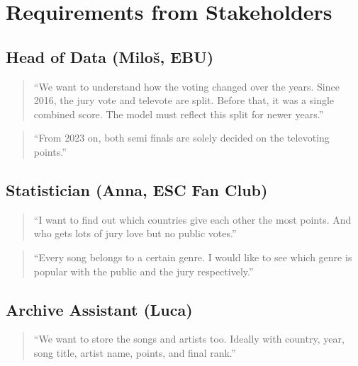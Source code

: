 \section{Requirements from Stakeholders}

\subsection*{Head of Data (Miloš, EBU)}
\begin{quote}
“We want to understand how the voting changed over the years. Since 2016, the jury vote and televote are split. Before that, it was a single combined score. The model must reflect this split for newer years.”
\end{quote}

\begin{quote}
“From 2023 on, both semi finals are solely decided on the televoting points.”
\end{quote}

\subsection*{Statistician (Anna, ESC Fan Club)}
\begin{quote}
“I want to find out which countries give each other the most points. And who gets lots of jury love but no public votes.”
\end{quote}

\begin{quote}
“Every song belongs to a certain genre. I would like to see which genre is popular with the public and the jury respectively.”
\end{quote}

\subsection*{Archive Assistant (Luca)}
\begin{quote}
“We want to store the songs and artists too. Ideally with country, year, song title, artist name, points, and final rank.”
\end{quote}